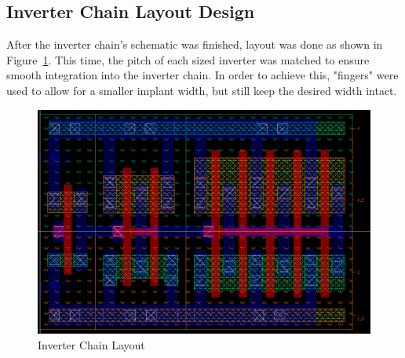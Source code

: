 \documentclass[12pt]{article}
\begin{document}
\subsection{Inverter Chain Layout Design}
After the inverter chain's schematic was finished, layout was done as shown in Figure~\ref{fig:layout}. This time, the pitch of
each sized inverter was matched to
ensure smooth integration into the inverter chain. In order to achieve this, "fingers" were used to allow for a smaller implant
width, but still keep the desired width intact.
\begin{figure}[!htb]
    \centering
    \includegraphics[width=5in]{figures/layout.png}
    \caption{Inverter Chain Layout}\label{fig:layout}
\end{figure}
\end{document}
